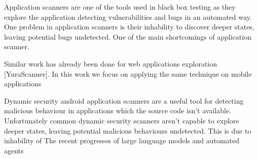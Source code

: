 Application scanners are one of the tools used in black box testing as
they explore the application detecting vulnerabilities and bugs in an
automated way. One problem in application scanners is their inhability
to discover deeper states, leaving potential bugs undetected. One of the
main shortcomings of application scanner.

Similar work has already been done for web applications exploration
{[}YuraScanner{]}. In this work we focus on applying the same technique
on mobile applications

Dynamic security android application scanners are a useful tool for
detecting malicious behaviour in applications which the source code
isn't available. Unfortunately common dynamic security scanners aren't
capable to explore deeper states, leaving potential malicious behaviours
undetected. This is due to inhability of The recent progresses of large
language models and automated agents
